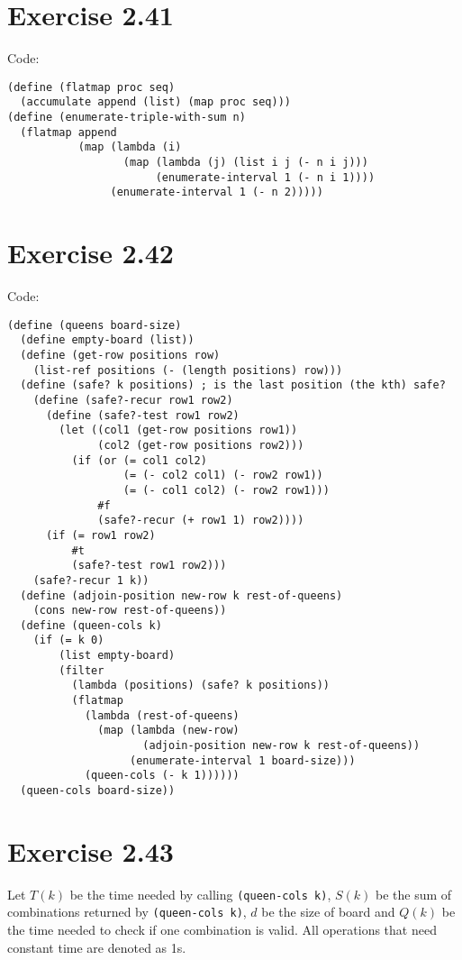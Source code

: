 \documentclass[../main.tex]{subfiles}
\begin{document}
\section{Exercise 2.41}

Code:

\begin{lstlisting}
(define (flatmap proc seq)
  (accumulate append (list) (map proc seq)))
(define (enumerate-triple-with-sum n)
  (flatmap append
           (map (lambda (i)
                  (map (lambda (j) (list i j (- n i j)))
                       (enumerate-interval 1 (- n i 1))))
                (enumerate-interval 1 (- n 2)))))
\end{lstlisting}

\section{Exercise 2.42}

Code:

\begin{lstlisting}
(define (queens board-size)
  (define empty-board (list))
  (define (get-row positions row)
    (list-ref positions (- (length positions) row)))
  (define (safe? k positions) ; is the last position (the kth) safe?
    (define (safe?-recur row1 row2)
      (define (safe?-test row1 row2)
        (let ((col1 (get-row positions row1))
              (col2 (get-row positions row2)))
          (if (or (= col1 col2)
                  (= (- col2 col1) (- row2 row1))
                  (= (- col1 col2) (- row2 row1)))
              #f
              (safe?-recur (+ row1 1) row2))))
      (if (= row1 row2)
          #t
          (safe?-test row1 row2)))
    (safe?-recur 1 k))
  (define (adjoin-position new-row k rest-of-queens)
    (cons new-row rest-of-queens))
  (define (queen-cols k)
    (if (= k 0)
        (list empty-board)
        (filter
          (lambda (positions) (safe? k positions))
          (flatmap
            (lambda (rest-of-queens)
              (map (lambda (new-row)
                     (adjoin-position new-row k rest-of-queens))
                   (enumerate-interval 1 board-size)))
            (queen-cols (- k 1))))))
  (queen-cols board-size))
\end{lstlisting}

\section{Exercise 2.43}

Let $T(k)$ be the time needed by calling \lstinline{(queen-cols k)},
 $S(k)$ be the sum of combinations returned by
 \lstinline{(queen-cols k)}, $d$ be the size of board and
 $Q(k)$ be the time needed to check if one combination
 is valid. All operations that need constant time
 are denoted as 1s.
\end{document}
